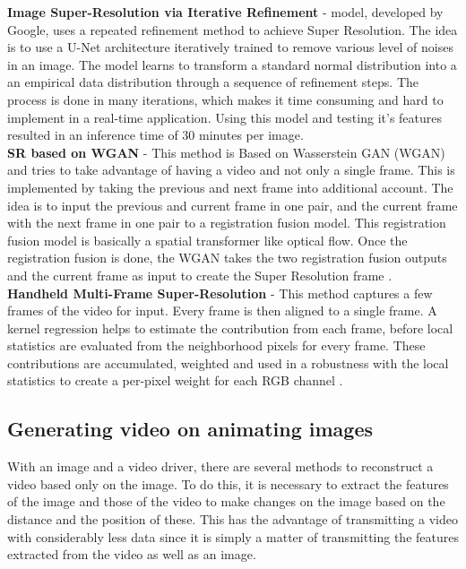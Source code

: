 \documentclass[10pt,twocolumn,letterpaper]{article}
\begin{document}
\textbf{Image Super-Resolution via Iterative Refinement} -  model, developed by Google, uses a repeated refinement method to achieve Super Resolution. The idea is to use a U-Net architecture iteratively trained to  remove various level of noises in an image. The model learns to transform a standard normal distribution into a an empirical data distribution through a sequence of refinement steps.\cite{googlesr} The process is done in many iterations, which makes it time consuming and hard to implement in a real-time application. Using this model and testing it's features resulted in an inference time of 30 minutes per image.\\

\textbf{SR based on WGAN} - This method is Based on Wasserstein GAN (WGAN) and tries to take advantage of having a video and not only a single frame. This is implemented by taking the previous and next frame into additional account. The idea is to input the previous and current frame in one pair, and the current frame with the next frame in one pair to a registration fusion model. This registration fusion model is basically a spatial transformer like optical flow. Once the registration fusion is done, the WGAN takes the two registration fusion outputs and the current frame as input to create the Super Resolution frame \cite{WganSR}.\\

\textbf{Handheld Multi-Frame Super-Resolution} - This method captures a few frames of the video for input. Every frame is then aligned to a single frame. A kernel regression helps to estimate the contribution from each frame, before local statistics are evaluated from the neighborhood pixels for every frame. These contributions are accumulated, weighted and used in a robustness with the local statistics to create a per-pixel weight for each RGB channel \cite{HMFSR}. \\

\subsection{Generating video on animating images}

With an image and a video driver, there are several methods to reconstruct a video based only on the image. To do this, it is necessary to extract the features of the image and those of the video to make changes on the image based on the distance and the position of these. This has the advantage of transmitting a video with considerably less data since it is simply a matter of transmitting the features extracted from the video as well as an image. \\
\end{document}
